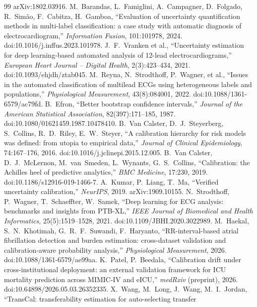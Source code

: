 \documentclass[review,12pt,nonatbib]{elsarticle}
\begin{document}
\begin{thebibliography}{99}
arXiv:1802.03916.
 M.~Barandas, L.~Famiglini, A.~Campagner,
D.~Folgado, R.~Sim\~ao, F.~Cabitza, H.~Gamboa, ``Evaluation of
uncertainty quantification methods in multi-label classification: a
case study with automatic diagnosis of electrocardiogram,''
\emph{Information Fusion}, 101:101978, 2024.
doi:10.1016/j.inffus.2023.101978.
 J.~F.~Vranken et al., ``Uncertainty estimation for
deep learning-based automated analysis of 12-lead
electrocardiograms,'' \emph{European Heart Journal -- Digital Health},
2(3):423--434, 2021. doi:10.1093/ehjdh/ztab045.
 M.~Reyna, N.~Strodthoff, P.~Wagner, et al.,
``Issues in the automated classification of multilead ECGs using
heterogeneous labels and populations,'' \emph{Physiological
Measurement}, 43(8):084001, 2022. doi:10.1088/1361-6579/ac79fd.
 B.~Efron, ``Better bootstrap confidence
intervals,'' \emph{Journal of the American Statistical Association},
82(397):171--185, 1987. doi:10.1080/01621459.1987.10478410.
 B.~Van Calster, D.~J.~Steyerberg,
S.~Collins, R.~D.~Riley, E.~W.~Steyer, ``A calibration hierarchy for
risk models was defined: from utopia to empirical data,''
\emph{Journal of Clinical Epidemiology}, 74:167--176, 2016.
doi:10.1016/j.jclinepi.2015.12.005.
 B.~Van Calster, D.~J.~McLernon,
M.~van~Smeden, L.~Wynants, G.~S.~Collins, ``Calibration: the Achilles
heel of predictive analytics,'' \emph{BMC Medicine}, 17:230, 2019.
doi:10.1186/s12916-019-1466-7.
 A.~Kumar, P.~Liang, T.~Ma, ``Verified uncertainty
calibration,'' \emph{NeurIPS}, 2019. arXiv:1909.10155.
 N.~Strodthoff, P.~Wagner, T.~Schaeffter,
W.~Samek, ``Deep learning for ECG analysis: benchmarks and insights
from PTB-XL,'' \emph{IEEE Journal of Biomedical and Health
Informatics}, 25(5):1519--1528, 2021.
doi:10.1109/JBHI.2020.3022989.
 M.~Haekal, S.~N.~Khotimah,
G.~R.~F.~Suwandi, F.~Haryanto, ``RR-interval-based atrial fibrillation
detection and burden estimation: cross-dataset validation and
calibration-aware probability analysis,'' \emph{Physiological
Measurement}, 2026. doi:10.1088/1361-6579/ae99aa.
 K.~Patel, P.~Beedala, ``Calibration drift under
cross-institutional deployment: an external validation framework for
ICU mortality prediction across MIMIC-IV and eICU,'' \emph{medRxiv}
(preprint), 2026. doi:10.64898/2026.05.03.26352335.
 X.~Wang, M.~Long, J.~Wang, M.~I.~Jordan,
``TransCal: transferability estimation for auto-selecting transfer

\end{thebibliography}
\end{document}
